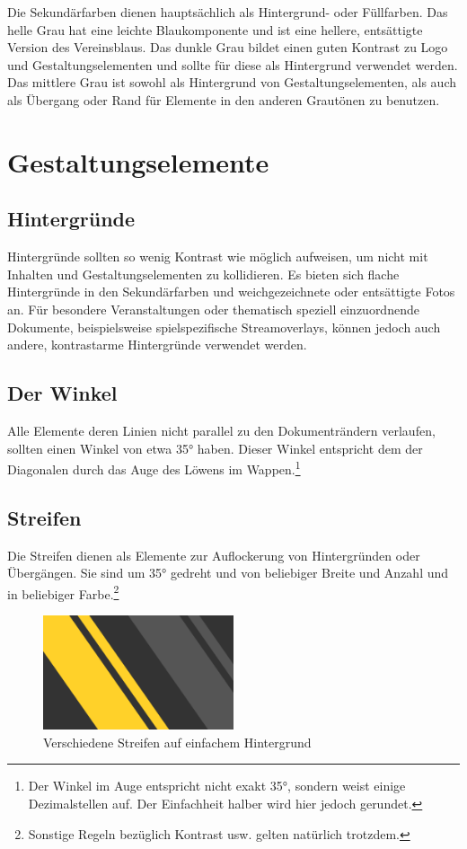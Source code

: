 \documentclass{article}
\begin{document}
Die Sekundärfarben dienen hauptsächlich als Hintergrund- oder Füllfarben. Das helle Grau hat eine leichte Blaukomponente und ist eine hellere, entsättigte Version des Vereinsblaus. Das dunkle Grau bildet einen guten Kontrast zu Logo und Gestaltungselementen und sollte für diese als Hintergrund verwendet werden. Das mittlere Grau ist sowohl als Hintergrund von Gestaltungselementen, als auch als Übergang oder Rand für Elemente in den anderen Grautönen zu benutzen.

\cleardoublepage
\section{Gestaltungselemente}

\subsection{Hintergründe}
Hintergründe sollten so wenig Kontrast wie möglich aufweisen, um nicht mit Inhalten und Gestaltungselementen zu kollidieren. Es bieten sich flache Hintergründe in den Sekundärfarben und weichgezeichnete oder entsättigte Fotos an. Für besondere Veranstaltungen oder thematisch speziell einzuordnende Dokumente, beispielsweise spielspezifische Streamoverlays, können jedoch auch andere, kontrastarme Hintergründe verwendet werden.


\subsection{Der Winkel}
Alle Elemente deren Linien nicht parallel zu den Dokumenträndern verlaufen, sollten einen Winkel von etwa 35° haben. Dieser Winkel entspricht dem der Diagonalen durch das Auge des Löwens im Wappen.\footnote{Der Winkel im Auge entspricht nicht exakt 35°, sondern weist einige Dezimalstellen auf. Der Einfachheit halber wird hier jedoch gerundet.}


\subsection{Streifen}
Die Streifen dienen als Elemente zur Auflockerung von Hintergründen oder Übergängen. Sie sind um 35° gedreht und von beliebiger Breite und Anzahl und in beliebiger Farbe.\footnote{Sonstige Regeln bezüglich Kontrast usw. gelten natürlich trotzdem.}

\begin{figure}[H]
\begin{center}
\includegraphics[width=0.5\textwidth]{Docs/streifen_beispiel.png}
\end{center}
\caption{Verschiedene Streifen auf einfachem Hintergrund}
\end{figure}
\end{document}

